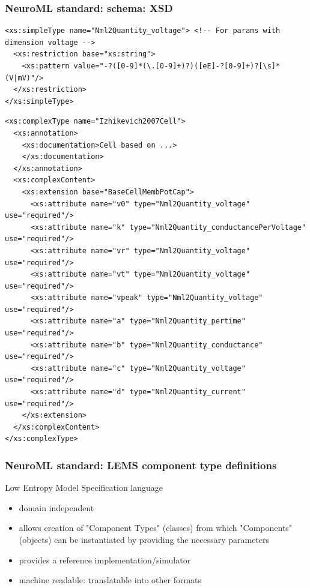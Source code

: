 \begin{frame}[fragile,c]
  \frametitle{NeuroML standard: schema: XSD}
  \begin{center}
    \begin{verbatim}
<xs:simpleType name="Nml2Quantity_voltage"> <!-- For params with dimension voltage -->
  <xs:restriction base="xs:string">
    <xs:pattern value="-?([0-9]*(\.[0-9]+)?)([eE]-?[0-9]+)?[\s]*(V|mV)"/>
  </xs:restriction>
</xs:simpleType>
    \end{verbatim}
    \pause{}
    \begin{verbatim}
<xs:complexType name="Izhikevich2007Cell">
  <xs:annotation>
    <xs:documentation>Cell based on ...>
    </xs:documentation>
  </xs:annotation>
  <xs:complexContent>
    <xs:extension base="BaseCellMembPotCap">
      <xs:attribute name="v0" type="Nml2Quantity_voltage" use="required"/>
      <xs:attribute name="k" type="Nml2Quantity_conductancePerVoltage" use="required"/>
      <xs:attribute name="vr" type="Nml2Quantity_voltage" use="required"/>
      <xs:attribute name="vt" type="Nml2Quantity_voltage" use="required"/>
      <xs:attribute name="vpeak" type="Nml2Quantity_voltage" use="required"/>
      <xs:attribute name="a" type="Nml2Quantity_pertime" use="required"/>
      <xs:attribute name="b" type="Nml2Quantity_conductance" use="required"/>
      <xs:attribute name="c" type="Nml2Quantity_voltage" use="required"/>
      <xs:attribute name="d" type="Nml2Quantity_current" use="required"/>
    </xs:extension>
  </xs:complexContent>
</xs:complexType>
    \end{verbatim}
  \end{center}
\end{frame}
\begin{frame}[t]
  \frametitle{NeuroML standard: LEMS component type definitions}
  \alert{L}ow \alert{E}ntropy \alert{M}odel \alert{S}pecification language
    \begin{itemize}
      \item domain independent
      \item allows creation of "Component Types" \alert{(classes)} from which "Components" \alert{(objects)} can be instantiated by providing the necessary parameters
      \item provides a \alert{reference implementation/simulator}
        \pause{}
      \item machine readable: \alert{translatable} into other formats
    \end{itemize}
\end{frame}
